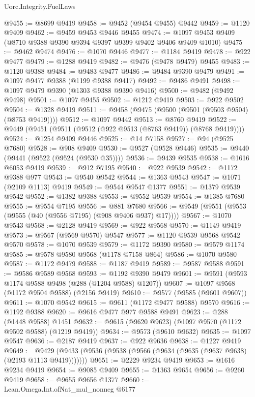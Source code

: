 \begin{lexlean}{Uorc.Integrity.FuelLaws}
\begin{coremodule}
@9455 := @8699 @9419
@9458 := @9452 (@9454 @9455) @9442
@9459 := @1120 @9409
@9462 := @9459 @9453 @9446 @9455
@9474 := @1097 @9453 @9409 (@8710 @9388 @9390 @9394 @9397 @9399 @9402 @9406 @9409 @1010)
@9475 := @9462 @9474
@9476 := @1070 @9446
@9477 := @1184 @9419
@9478 := @922 @9477
@9479 := @1288 @9419
@9482 := @9476 (@9478 @9479) @9455
@9483 := @1120 @9388
@9484 := @9483 @9477
@9486 := @9484 @9390 @9479
@9491 := @1097 @9477 @9388 (@1199 @9388 @9417)
@9492 := @9486 @9491
@9498 := @1097 @9479 @9390 (@1303 @9388 @9390 @9416)
@9500 := @9482 (@9492 @9498)
@9501 := @1097 @9455
@9502 := @1212 @9419
@9503 := @922 @9502
@9504 := @1328 @9419
@9511 := @9458 (@9475 (@9500 (@9501 (@9503 @9504) (@8753 @9419))))
@9512 := @1097 @9442
@9513 := @8760 @9419
@9522 := @9449 (@9451 (@9511 (@9512 (@922 @9513 (@8763 @9419)) (@8768 @9419))))
@9524 := @1254 @9409 @9446
@9525 := @14 @7158
@9527 := @94 (@9525 @7680)
@9528 := @908 @9409
@9530 := @9527 (@9528 @9446)
@9535 := @9440 (@9441 (@9522 (@9524 (@9530 @35))))
@9536 := @9439 @9535
@9538 := @1616 @6053 @9419
@9539 := @912 @7195
@9540 := @922 @9539
@9542 := @1172 @9388 @977
@9543 := @9540 @9542
@9544 := @1363 @9543
@9547 := @1071 (@2109 @1113) @9419
@9549 := @9544 @9547 @1377
@9551 := @1379 @9539 @9542
@9552 := @1382 @9388
@9553 := @9552 @9539
@9554 := @1385 @7680
@9555 := @9554 @7195
@9556 := @881 @7680
@9566 := @9549 (@9551 (@9553 (@9555 (@40 (@9556 @7195) (@908 @9406 @937) @17))))
@9567 := @1070 @9543
@9568 := @2128 @9419
@9569 := @922 @9568
@9570 := @1149 @9419
@9573 := @9567 (@9569 @9570) @9547
@9577 := @1120 @9539 @9568 @9542 @9570
@9578 := @1070 @9539
@9579 := @1172 @9390
@9580 := @9579 @1174
@9585 := @9578 @9580 @9568 (@1178 @7158 @864)
@9586 := @1070 @9580
@9587 := @1172 @9479
@9588 := @1187 @9419
@9589 := @9587 @9588
@9591 := @9586 @9589 @9568
@9593 := @1192 @9390 @9479
@9601 := @9591 (@9593 @1174 @9588 @9498 (@288 (@1204 @9588) @1207))
@9607 := @1097 @9568 (@1172 @9504 @9588) (@2156 @9419)
@9610 := @9577 (@9585 (@9601 @9607))
@9611 := @1070 @9542
@9615 := @9611 (@1172 @9477 @9588) @9570
@9616 := @1192 @9388
@9620 := @9616 @9477 @977 @9588 @9491
@9623 := @288 (@1448 @9588) @1451
@9632 := @9615 (@9620 @9623) (@1097 @9570 (@1172 @9502 @9588) (@1219 @9419))
@9634 := @9573 (@9610 @9632)
@9635 := @1097 @9547
@9636 := @2187 @9419
@9637 := @922 @9636
@9638 := @1227 @9419
@9649 := @9429 (@9433 (@9536 (@9538 (@9566 (@9634 (@9635 (@9637 @9638) (@2193 @1113 @9419)))))))
@9651 := @2229 @9234 @9419
@9653 := @1616 @9234 @9419
@9654 := @9085 @9409
@9655 := @1363 @9654
@9656 := @9260 @9419
@9658 := @9655 @9656 @1377
@9660 := Lean.Omega.Int.ofNat_mul_nonneg @6177

\end{coremodule}
\end{lexlean}
